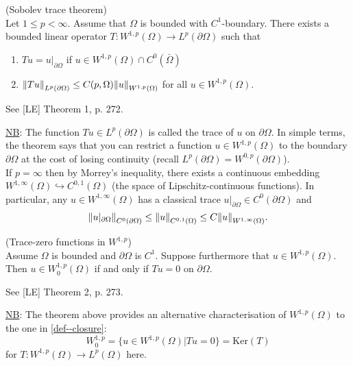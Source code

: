 \documentclass[11pt]{article}
\begin{document}
    		\begin{thm}
    			(Sobolev trace theorem)\\
    			Let $1\le p<\infty$. Assume that $\Omega$ is bounded with $C^1$-boundary. There exists a bounded linear operator $T:W^{1,p}(\Omega)\rightarrow L^p(\partial\Omega)$ such that
    			\begin{enumerate}
    				\item $Tu=u|_{\partial\Omega}$ if $u\in W^{1,p}(\Omega)\cap C^0(\bar{\Omega})$
    				\item $\norm{Tu}_{L^p(\partial\Omega)}\le C(p,\Omega)\norm{u}_{W^{1,p}(\Omega)}$ for all $u\in W^{1,p}(\Omega)$.
    			\end{enumerate}
    		\end{thm}
    		\begin{pproof}
    			See [LE] Theorem 1, p. 272.
    		\end{pproof}
    
    		\noindent\underline{NB}: The function $Tu\in L^p(\partial\Omega)$ is called the trace of $u$ on $\partial\Omega$. In simple terms, the theorem says that you can restrict a function $u\in W^{1,p}(\Omega)$ to the boundary $\partial\Omega$ at the cost of losing continuity (recall $L^p(\partial\Omega)=W^{0,p}(\partial\Omega)$).
    		\\
    
    		If $p=\infty$ then by Morrey's inequality, there exists a continuous embedding $W^{1,\infty}(\Omega)\hookrightarrow C^{0,1}(\Omega)$ (the space of Lipschitz-continuous functions). In particular, any $u\in W^{1,\infty}(\Omega)$ has a classical trace $u|_{\partial\Omega}\in C^0(\partial\Omega)$ and
    		\begin{equation*}
    			\norm{u|_{\partial\Omega}}_{C^0(\partial\Omega)}\le\norm{u}_{C^{0,1}(\Omega)}\le C\norm{u}_{W^{1,\infty}(\Omega)}.
    		\end{equation*}
    
    		\begin{thm}
    			(Trace-zero functions in $W^{1,p}$)\\
    			Assume $\Omega$ is bounded and $\partial \Omega$ is $C^1$. Suppose furthermore that $u\in W^{1,p}(\Omega)$. Then $u\in W^{1,p}_0(\Omega)$ if and only if $Tu=0$ on $\partial\Omega$.
    		\end{thm}
    		\begin{pproof}
    			See [LE] Theorem 2, p. 273.
    		\end{pproof}
    
    		\noindent\underline{NB}: The theorem above provides an alternative characterisation of $W^{1,p}(\Omega)$ to the one in \autoref{def--closure}:
    		\begin{equation*}
    			W^{1,p}_0=\{u\in W^{1,p}(\Omega)|Tu=0\}=\mathrm{Ker} (T)
    		\end{equation*}
    		for $T:W^{1,p}(\Omega)\rightarrow L^p(\Omega)$ here.
    
\end{document}

